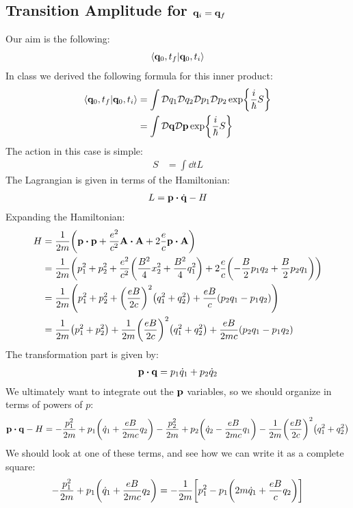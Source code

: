 \documentclass[12pt]{article}
\newcommand{\cD}{\mathcal{D}}
\newcommand{\q}{\vb{q}}
\newcommand{\p}{\vb{p}}
\begin{document}
\subsection{Transition Amplitude for $\vb{q}_i=\vb{q}_f$}
Our aim is the following:
\begin{align*}
  \ip{\q_0,t_f}{\q_0,t_i}
\end{align*}
In class we derived the following formula for this inner product:
\begin{align*}
  \ip{\q_0,t_f}{\q_0,t_i}&=\int\cD q_1\cD q_2\cD p_1\cD p_2
  \exp{\frac{i}{\hbar}S}\\
  &=\int\cD\q\cD\p\exp{\frac{i}{\hbar}S}
\end{align*}
The action in this case is simple:
\begin{align*}
  S&=\int\dd{t}L
\end{align*}
The Lagrangian is given in terms of the Hamiltonian:
\begin{align*}
  L=\p\vdot\dot{\q}-H
\end{align*}
Expanding the Hamiltonian:
\begin{align*}
  H&=\frac{1}{2m}\qty(\p\vdot\p+\frac{e^2}{c^2}\vb{A\vdot A}+
  2\frac{e}{c}\p\vdot\vb{A})\\
  &=\frac{1}{2m}\qty(p_1^2+p_2^2+
  \frac{e^2}{c^2}\qty(\frac{B^2}{4}x_2^2+\frac{B^2}{4}q_1^2)+
  2\frac{e}{c}\qty(-\frac{B}{2}p_1q_2+\frac{B}{2}p_2q_1))\\
  &=\frac{1}{2m}\qty(p_1^2+p_2^2+\qty(\frac{eB}{2c})^2\qty(q_1^2+q_2^2)
  +\frac{eB}{c}\qty(p_2q_1-p_1q_2))\\
  &=\frac{1}{2m}\qty(p_1^2+p_2^2)
  +\frac{1}{2m}\qty(\frac{eB}{2c})^2\qty(q_1^2+q_2^2)
  +\frac{eB}{2mc}\qty(p_2q_1-p_1q_2)
\end{align*}
The transformation part is given by:
\begin{align*}
  \p\vdot\q=p_1\dot{q}_1+p_2\dot{q}_2
\end{align*}
We ultimately want to integrate out the $\p$ variables, so we should organize in terms of powers of $p$:
\begin{align*}
  \p\vdot\q-H=-\frac{p_1^2}{2m}+p_1\qty(\dot{q}_1+\frac{eB}{2mc}q_2)
  -\frac{p_2^2}{2m}+p_2\qty(\dot{q}_2-\frac{eB}{2mc}q_1)
  -\frac{1}{2m}\qty(\frac{eB}{2c})^2\qty(q_1^2+q_2^2)
\end{align*}
We should look at one of these terms, and see how we can write it as a complete square:
\begin{align*}
  -\frac{p_1^2}{2m}+p_1\qty(\dot{q}_1+\frac{eB}{2mc}q_2)=
  -\frac{1}{2m}\qty[p_1^2-p_1\qty(2m\dot{q}_1+\frac{eB}{c}q_2)]
\end{align*}
\end{document}
